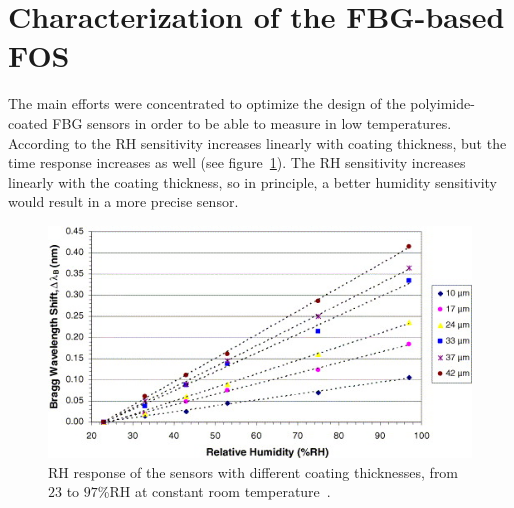 \section{Characterization of the FBG-based FOS}
The main efforts were concentrated to optimize the design of the polyimide-coated FBG sensors in order to be able to measure in low temperatures. According to \cite{YEO_PI} the \gls{RH} sensitivity increases linearly with coating thickness, but the time response increases as well (see figure~\ref{fig:yeo}). The \gls{RH} sensitivity increases linearly with the coating thickness, so in principle, a better humidity sensitivity would result in a more precise sensor.

\begin{figure}[!h]
\centering
\includegraphics[width=0.80\columnwidth]{Chapter5/images/yeo_coating.jpg}
\caption{RH response of the sensors with different coating thicknesses, from $23$ to $97$\%RH at constant room temperature~\cite{YEO_PI}.}
\label{fig:yeo}
\end{figure}

